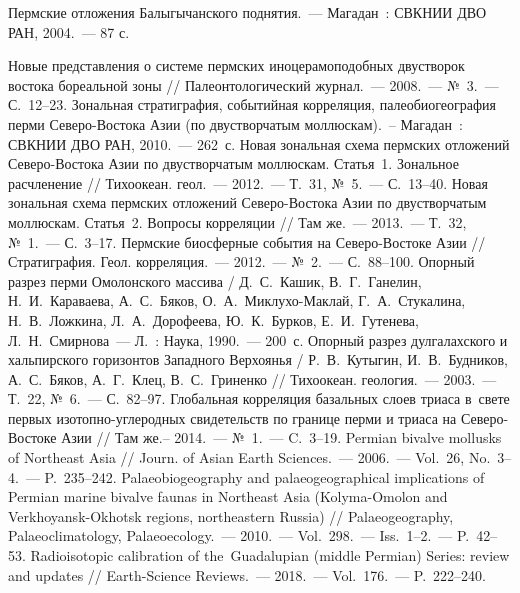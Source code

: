 \begin{thebibliography}{99}
\bibitem{} Пермские отложения Балыгычанского поднятия.~--- Магадан~: СВКНИИ ДВО РАН, 2004.~--- 87 с.

\bibitem{} Новые представления о системе пермских иноцерамоподобных двустворок востока бореальной зоны // Палеонтологический журнал.~--- 2008.~---  №~3.~--- С.~12--23.
\bibitem{} Зональная стратиграфия, событийная корреляция, палеобиогеография перми Северо-Востока Азии (по двустворчатым моллюскам).~-- Магадан~: СВКНИИ ДВО РАН, 2010.~--- 262~с.
\bibitem{} Новая зональная схема пермских отложений Северо-Востока Азии по двустворчатым моллюскам. Статья~1. Зональное расчленение // Тихоокеан. геол.~---  2012.~--- Т.~31, №~5.~--- С.~13--40.
\bibitem{} Новая зональная схема пермских отложений Северо-Востока Азии по двустворчатым моллюскам. Статья~2. Вопросы корреляции // Там же.~---  2013.~---  Т.~32, №~1.~--- С.~3--17.
\bibitem{} Пермские биосферные события на Северо-Востоке Азии // Стратиграфия. Геол. корреляция.~---  2012.~---  №~2.~---  С.~88--100.
\bibitem{} Опорный разрез перми Омолонского массива / Д.~С.~Кашик, В.~Г.~Ганелин, Н.~И.~Караваева, А.~С.~Бяков, О.~А.~Миклухо-Маклай, Г.~А.~Стукалина, Н.~В.~Ложкина, Л.~А.~Дорофеева, Ю.~К.~Бурков, Е.~И.~Гутенева, Л.~Н.~Смирнова~--- Л.~: Наука, 1990.~---  200~с.
\bibitem{} Опорный разрез дулгалахского и хальпирского горизонтов Западного Верхоянья / Р.~В.~Кутыгин, И.~В.~Будников, А.~С.~Бяков, А.~Г.~Клец, В.~С.~Гриненко // Тихоокеан. геология.~---  2003.~---  Т.~22, №~6.~---  С.~82--97.
\bibitem{} Глобальная корреляция базальных слоев триаса в~свете первых изотопно-углеродных свидетельств по границе перми и триаса на Северо-Востоке Азии // Там же.­--  2014.~---  №~1.~---  C.~3--19.
\bibitem{} Permian bivalve mollusks of Northeast Asia // Journ. of Asian Earth Sciences.~--- 2006.~--- Vol.~26, No.~3--4.~--- P.~235--242.
\bibitem{} Palaeobiogeography and palaeogeographical implications of Permian marine bivalve faunas in Northeast Asia (Kolyma-Omolon and Verkhoyansk-Okhotsk regions, northeastern Russia) // Palaeogeography, Palaeoclimatology, Palaeoecology.~--- 2010.~--- Vol.~298.~--- Iss.~1--2.~--- P.~42--53.
\bibitem{} Radioisotopic calibration of the~Guadalupian (middle Permian) Series: review and updates // Earth-Science Reviews.~--- 2018.~--- Vol.~176.~--- P.~222--240.

\end{thebibliography}
